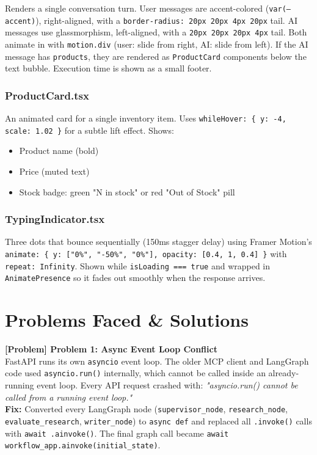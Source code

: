 \documentclass[12pt]{article}
\newcommand{\problembox}[2]{%
  \vspace{6pt}%
  \noindent\colorbox{lightbg}{\parbox{\dimexpr\linewidth-2\fboxsep}{%
    \textbf{\textcolor{accent}{[Problem]} #1}\\[4pt]%
    #2%
  }}\vspace{6pt}%
}
\begin{document}
Renders a single conversation turn. User messages are accent-colored (\texttt{var(--accent)}), right-aligned, with a \texttt{border-radius: 20px 20px 4px 20px} tail. AI messages use glassmorphism, left-aligned, with a \texttt{20px 20px 20px 4px} tail. Both animate in with \texttt{motion.div} (user: slide from right, AI: slide from left). If the AI message has \texttt{products}, they are rendered as \texttt{ProductCard} components below the text bubble. Execution time is shown as a small footer.

\subsubsection{ProductCard.tsx}

An animated card for a single inventory item. Uses \texttt{whileHover: \{ y: -4, scale: 1.02 \}} for a subtle lift effect. Shows:
\begin{itemize}[leftmargin=1.5em]
    \item Product name (bold)
    \item Price (muted text)
    \item Stock badge: green "N in stock" or red "Out of Stock" pill
\end{itemize}

\subsubsection{TypingIndicator.tsx}

Three dots that bounce sequentially (150ms stagger delay) using Framer Motion's \texttt{animate: \{ y: ["0\%", "-50\%", "0\%"], opacity: [0.4, 1, 0.4] \}} with \texttt{repeat: Infinity}. Shown while \texttt{isLoading === true} and wrapped in \texttt{AnimatePresence} so it fades out smoothly when the response arrives.

\section{Problems Faced \& Solutions}

\problembox{Problem 1: Async Event Loop Conflict}{%
FastAPI runs its own \texttt{asyncio} event loop. The older MCP client and LangGraph code used \texttt{asyncio.run()} internally, which cannot be called inside an already-running event loop. Every API request crashed with: \textit{"asyncio.run() cannot be called from a running event loop."} \\[4pt]
\textbf{Fix:} Converted every LangGraph node (\texttt{supervisor\_node}, \texttt{research\_node}, \texttt{evaluate\_research}, \texttt{writer\_node}) to \texttt{async def} and replaced all \texttt{.invoke()} calls with \texttt{await .ainvoke()}. The final graph call became \texttt{await workflow\_app.ainvoke(initial\_state)}.%
}
\end{document}
